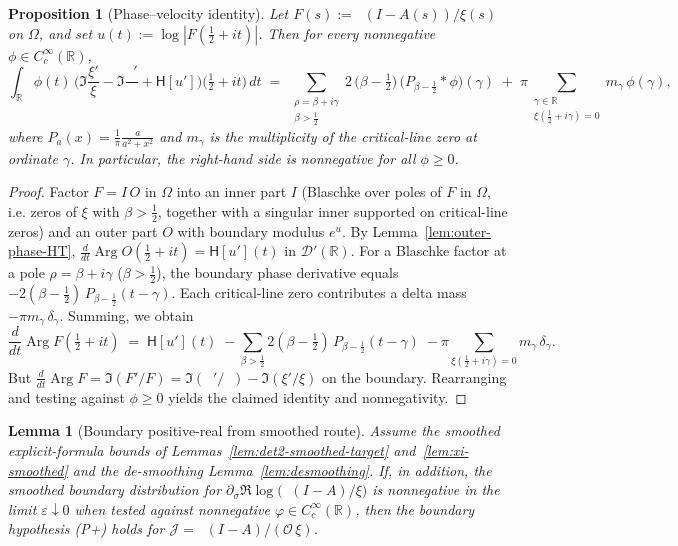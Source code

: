 \documentclass[11pt]{article}
\newtheorem{proposition}[theorem]{Proposition}
\newtheorem{lemma}[theorem]{Lemma}
\theoremstyle{definition}
\theoremstyle{remark}
\newcommand{\R}{\mathbb{R}}
\DeclareMathOperator{\dettwo}{det_2}
\DeclareMathOperator{\Arg}{Arg}
\begin{document}
\begin{proposition}[Phase–velocity identity]\label{prop:phase-velocity-identity}
Let \(F(s):=\dettwo(I-A(s))/\xi(s)\) on \(\Omega\), and set \(u(t):=\log|F(\tfrac12+it)|\). Then for every nonnegative \(\phi\in C_c^\infty(\R)\),
\[
 \int_{\R}\!\phi(t)\,\Big(\Im\frac{\xi'}{\xi}-\Im\frac{\dettwo'}{\dettwo}+\mathsf H[u']\Big)\!\Big(\tfrac12+it\Big)\,dt
 \;=\; \sum_{\substack{\rho=\beta+i\gamma\\ \beta>\tfrac12}} 2\,\big(\beta-\tfrac12\big)\,\big(P_{\beta-\tfrac12}\!\ast\phi\big)(\gamma)
 \; +\; \pi\!\!\sum_{\substack{\gamma\in\R\\ \xi(\tfrac12+i\gamma)=0}} m_\gamma\,\phi(\gamma),
\]
where \(P_a(x)=\tfrac{1}{\pi}\tfrac{a}{a^2+x^2}\) and \(m_\gamma\) is the multiplicity of the critical-line zero at ordinate \(\gamma\). In particular, the right-hand side is nonnegative for all \(\phi\ge 0\).
\end{proposition}
\begin{proof}
Factor \(F=I\,O\) in \(\Omega\) into an inner part \(I\) (Blaschke over poles of \(F\) in \(\Omega\), i.e. zeros of \(\xi\) with \(\beta>\tfrac12\), together with a singular inner supported on critical-line zeros) and an outer part \(O\) with boundary modulus \(e^{u}\). By Lemma~\ref{lem:outer-phase-HT}, \(\tfrac{d}{dt}\Arg O(\tfrac12+it)=\mathsf H[u'](t)\) in \(\mathcal D'(\R)\). For a Blaschke factor at a pole \(\rho=\beta+i\gamma\) (\(\beta>\tfrac12\)), the boundary phase derivative equals \(-2(\beta-\tfrac12)\,P_{\beta-\tfrac12}(t-\gamma)\). Each critical-line zero contributes a delta mass \(-\pi m_\gamma\,\delta_\gamma\). Summing, we obtain
\[
 \frac{d}{dt}\Arg F(\tfrac12+it)\;=\; \mathsf H[u'](t)\;-
 \sum_{\beta>\tfrac12}2(\beta-\tfrac12)\,P_{\beta-\tfrac12}(t-\gamma)\;-
 \pi\sum_{\xi(\tfrac12+i\gamma)=0} m_\gamma\,\delta_\gamma.
\]
But \(\tfrac{d}{dt}\Arg F=\Im(F'/F)=\Im(\dettwo'/\dettwo)-\Im(\xi'/\xi)\) on the boundary. Rearranging and testing against \(\phi\ge 0\) yields the claimed identity and nonnegativity.
\end{proof}

\begin{lemma}[Boundary positive-real from smoothed route]\label{lem:boundary-posreal}
Assume the smoothed explicit-formula bounds of Lemmas~\ref{lem:det2-smoothed-target} and~\ref{lem:xi-smoothed} and the de-smoothing Lemma~\ref{lem:desmoothing}. If, in addition, the smoothed boundary distribution for \(\partial_\sigma\Re\log\big(\dettwo(I-A)/\xi\big)\) is nonnegative in the limit \(\varepsilon\downarrow 0\) when tested against nonnegative \(\varphi\in C_c^\infty(\R)\), then the boundary hypothesis \emph{(P+)} holds for \(\mathcal J=\dettwo(I-A)/(\mathcal O\,\xi)\).
\end{lemma}
\end{document}
